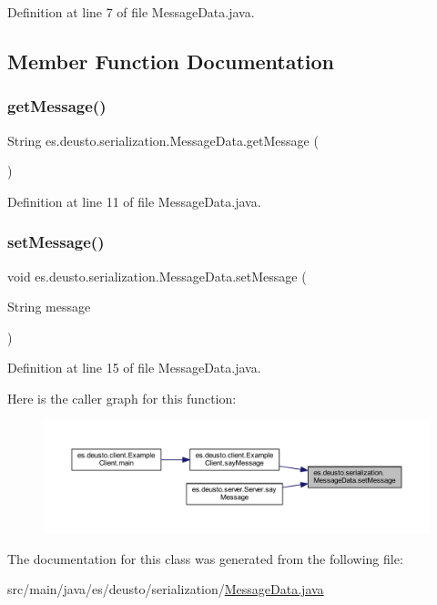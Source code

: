 Definition at line 7 of file Message\+Data.\+java.



\subsection{Member Function Documentation}
\mbox{\label{classes_1_1deusto_1_1serialization_1_1_message_data_ac44740b717cae3173157c7dbb0bc837e}} 
\subsubsection{\texorpdfstring{getMessage()}{getMessage()}}
{\footnotesize\ttfamily String es.\+deusto.\+serialization.\+Message\+Data.\+get\+Message (\begin{DoxyParamCaption}{ }\end{DoxyParamCaption})}



Definition at line 11 of file Message\+Data.\+java.

\mbox{\label{classes_1_1deusto_1_1serialization_1_1_message_data_a02ce68ccbf7500a3dfafe4ccf0b728ca}} 
\subsubsection{\texorpdfstring{setMessage()}{setMessage()}}
{\footnotesize\ttfamily void es.\+deusto.\+serialization.\+Message\+Data.\+set\+Message (\begin{DoxyParamCaption}\item[{String}]{message }\end{DoxyParamCaption})}



Definition at line 15 of file Message\+Data.\+java.

Here is the caller graph for this function\+:
\nopagebreak
\begin{figure}[H]
\begin{center}
\leavevmode
\includegraphics[width=350pt]{classes_1_1deusto_1_1serialization_1_1_message_data_a02ce68ccbf7500a3dfafe4ccf0b728ca_icgraph}
\end{center}
\end{figure}


The documentation for this class was generated from the following file\+:\begin{DoxyCompactItemize}
\item 
src/main/java/es/deusto/serialization/\mbox{\hyperlink{_message_data_8java}{Message\+Data.\+java}}\end{DoxyCompactItemize}
